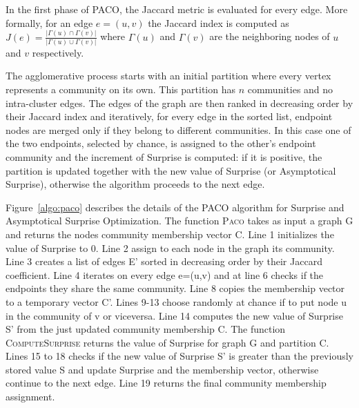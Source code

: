 In the first phase of PACO, the Jaccard metric is evaluated for every edge. More formally, for an edge $e=(u,v)$ the Jaccard index is computed as $J(e)=\frac{|\Gamma(u) \cap \Gamma(v)|}{|\Gamma(u) \cup \Gamma(v)|}$ where $\Gamma(u)$ and $\Gamma(v)$ are the neighboring nodes of $u$ and $v$ respectively.

The agglomerative process starts with an initial partition where every vertex represents a community on its own. This partition has $n$ communities and no intra-cluster edges.
The edges of the graph are then ranked in decreasing order by their Jaccard index and iteratively, for every edge in the sorted list, endpoint nodes are merged only if they belong to different communities. In this case one of the two endpoints, selected by chance, is assigned to the other's endpoint community and the increment of Surprise is computed: if it is positive, the partition is updated together with the new value of Surprise (or Asymptotical Surprise), otherwise the algorithm proceeds to the next edge.  

Figure~\ref{algo:paco} describes the details of the PACO algorithm for Surprise and Asymptotical Surprise Optimization.
The function \textsc{Paco} takes as input a graph G and returns the nodes community membership vector C. Line 1 initializes the value of Surprise to 0. Line 2 assign to each node in the graph its community. Line 3 creates a list of edges E' sorted in decreasing order by their Jaccard coefficient. Line 4 iterates on every edge e=(u,v) and at line 6 checks if the endpoints they share the same community. Line 8 copies the membership vector to a temporary vector C'. Lines 9-13 choose randomly at chance if to put node u in the community of v or viceversa. Line 14 computes the new value of Surprise S' from the just updated community membership C. The function \textsc{ComputeSurprise} returns the value of Surprise for graph G and partition C. Lines 15 to 18 checks if the new value of Surprise S' is greater than the previously stored value S and update Surprise and the membership vector, otherwise continue to the next edge. Line 19 returns the final community membership assignment.



